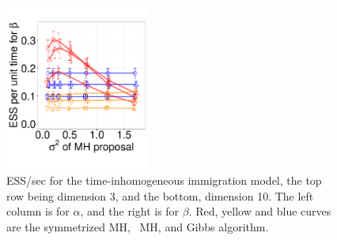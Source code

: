 {\begin{figure}
\begin{minipage}[!hp]{0.99\linewidth}
    \includegraphics [width=0.42\textwidth, angle=0]{figs/pc_10_beta.pdf}
    \vspace{-.3 in}
  \end{minipage}
  \begin{minipage}[!hp]{0.04\linewidth}
  \end{minipage}
    \caption{ESS/sec for the time-inhomogeneous immigration model, the top row 
      being dimension 3, and the bottom,
      dimension 10. The left column is for $\alpha$, and the 
    right is for $\beta$. Red, yellow and blue curves are the symmetrized MH,
  \naive\ MH, and Gibbs algorithm.}
     \label{fig:ESS_pc_10}
  \end{figure}

  \begin{figure}[H]
  \centering


\end{figure}}
